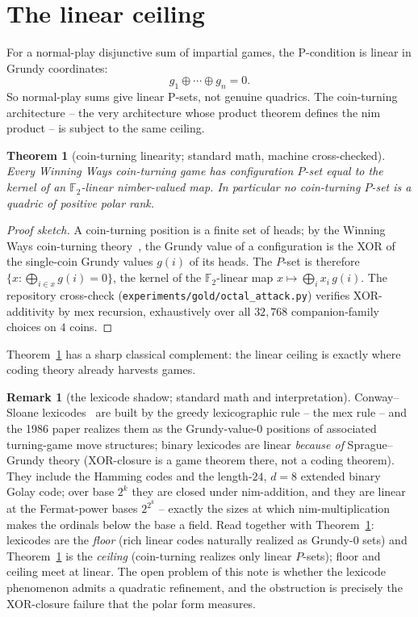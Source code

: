 \documentclass[11pt]{article}
\theoremstyle{plain}
\newtheorem{nogo}{Theorem}
\theoremstyle{definition}
\newtheorem{remark}{Remark}
\newcommand{\F}{\mathbb{F}}
\begin{document}
\section{The linear ceiling}\label{sec:linear}

For a normal-play disjunctive sum of impartial games, the P-condition is
linear in Grundy coordinates:
\[
  g_1\oplus\cdots\oplus g_n=0.
\]
So normal-play sums give linear P-sets, not genuine quadrics. The
coin-turning architecture -- the very architecture whose product theorem
defines the nim product -- is subject to the same ceiling.

\begin{nogo}[coin-turning linearity; standard math, machine cross-checked]
\label{thm:A}
Every Winning Ways coin-turning game has configuration $P$-set equal to the
kernel of an $\F_2$-linear nimber-valued map. In particular no coin-turning
$P$-set is a quadric of positive polar rank.
\end{nogo}

\begin{proof}[Proof sketch]
A coin-turning position is a finite set of heads; by the Winning Ways
coin-turning theory~\cite{WW}, the Grundy value of a configuration is the XOR
of the single-coin Grundy values $g(i)$ of its heads. The $P$-set is therefore
$\{x:\bigoplus_{i\in x}g(i)=0\}$, the kernel of the $\F_2$-linear map
$x\mapsto\bigoplus_i x_i\,g(i)$. The repository cross-check
(\texttt{experiments/gold/octal\_attack.py}) verifies XOR-additivity by mex
recursion, exhaustively over all $32{,}768$ companion-family choices on $4$
coins.
\end{proof}

Theorem~\ref{thm:A} has a sharp classical complement: the linear ceiling is
exactly where coding theory already harvests games.

\begin{remark}[the lexicode shadow; standard math and interpretation]
\label{rem:lexicode}
Conway--Sloane lexicodes~\cite{ConwaySloane86} are built by the greedy
lexicographic rule -- the mex rule -- and the 1986 paper realizes them as the
Grundy-value-$0$ positions of associated turning-game move structures; binary
lexicodes are linear \emph{because of} Sprague--Grundy theory (XOR-closure is
a game theorem there, not a coding theorem). They include the Hamming codes
and the length-$24$, $d=8$ extended binary Golay code; over base $2^k$ they
are closed under nim-addition, and they are linear at the Fermat-power bases
$2^{2^k}$ -- exactly the sizes at which nim-multiplication makes the ordinals
below the base a field. Read together with Theorem~\ref{thm:A}: lexicodes are
the \emph{floor} (rich linear codes naturally realized as Grundy-$0$ sets) and
Theorem~\ref{thm:A} is the \emph{ceiling} (coin-turning realizes only linear
$P$-sets); floor and ceiling meet at linear. The open problem of this note is
whether the lexicode phenomenon admits a quadratic refinement, and the
obstruction is precisely the XOR-closure failure that the polar form
measures.
\end{remark}
\end{document}
